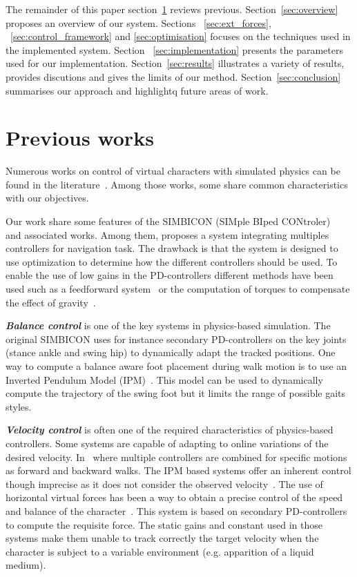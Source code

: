 \documentclass[conference]{acmsiggraph}
\begin{document}
The remainder of this paper section~\ref{sec:previous_works} reviews previous. Section~\ref{sec:overview} proposes an overview of our system. Sections ~\ref{sec:ext_forces}, ~\ref{sec:control_framework} and \ref{sec:optimisation} focuses on the techniques used in the implemented system. Section ~\ref{sec:implementation} presents the parameters used for our implementation. Section~\ref{sec:results} illustrates a variety of results, provides discutions and gives the limits of our method. Section~\ref{sec:conclusion} summarises our approach and highlightq future areas of work.
 
\section{Previous works}
\label{sec:previous_works}

Numerous works on control of virtual characters with simulated physics can be found in the literature~\cite{geijtenbeek2012interactive}. Among those works, some share common characteristics with our objectives.

Our work share some features of the SIMBICON (SIMple BIped CONtroler)~\cite{yin2007simbicon} and associated works. Among them, \cite{coros2009robust} proposes a system integrating multiples controllers for navigation task. The drawback is that the system is designed to use optimization to determine how the different controllers should be used. To enable the use of low gains in the PD-controllers different methods have been used such as a feedforward system~\cite{yin2007simbicon} or the computation of torques to compensate the effect of gravity~\cite{coros2010generalized}.

\textbf{\textit{Balance control}} is one of the key systems in physics-based simulation. The original SIMBICON uses for instance secondary PD-controllers on the key joints (stance ankle and swing hip) to dynamically adapt the tracked positions. One way to compute a balance aware foot placement during walk motion is to use an Inverted Pendulum Model (IPM)~\cite{coros2010generalized,kajita20013d}. This model can be used to dynamically compute the trajectory of the swing foot but it limits the range of possible gaits styles.

\textbf{\textit{Velocity control}} is often one of the required characteristics of physics-based controllers. Some systems are capable of adapting to online variations of the desired velocity. In~\cite{coros2009robust} where multiple controllers are combined for specific motions as forward and backward walks. The IPM based systems offer an inherent control though imprecise as it does not consider the observed velocity~\cite{coros2010generalized}. The use of horizontal virtual forces has been a way to obtain a precise control of the speed and balance of the character~\cite{coros2010generalized,geijtenbeek2012simple}. This system is based on secondary PD-controllers to compute the requisite force. The static gains and constant used in those systems make them unable to track correctly the target velocity when the character is subject to a variable environment (e.g. apparition of a liquid medium). 
\end{document}
